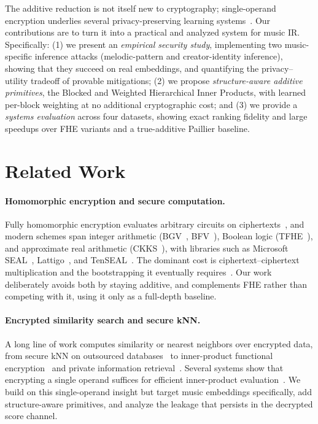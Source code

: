 \documentclass[sigconf,nonacm]{acmart}
\begin{document}
The additive reduction is not itself new to cryptography; single-operand encryption underlies several privacy-preserving learning systems~\cite{prism_sigmod21,otawose_sigmod23,zhao2025note,ipfe2015}. Our contributions are to turn it into a practical and analyzed system for music IR. Specifically: (1) we present an \emph{empirical security study}, implementing two music-specific inference attacks (melodic-pattern and creator-identity inference), showing that they succeed on real embeddings, and quantifying the privacy--utility tradeoff of provable mitigations; (2) we propose \emph{structure-aware additive primitives}, the Blocked and Weighted Hierarchical Inner Products, with learned per-block weighting at no additional cryptographic cost; and (3) we provide a \emph{systems evaluation} across four datasets, showing exact ranking fidelity and large speedups over FHE variants and a true-additive Paillier baseline.

\section{Related Work}
\label{sec:related}
\paragraph{Homomorphic encryption and secure computation.}
Fully homomorphic encryption evaluates arbitrary circuits on ciphertexts~\cite{cgentry_stoc09}, and modern schemes span integer arithmetic (BGV~\cite{bgv2012}, BFV~\cite{bfv2012}), Boolean logic (TFHE~\cite{tfhe2020}), and approximate real arithmetic (CKKS~\cite{cheon2017homomorphic}), with libraries such as Microsoft SEAL~\cite{sealcrypto}, Lattigo~\cite{lattigo}, and TenSEAL~\cite{benaissa2021tenseal}. The dominant cost is ciphertext--ciphertext multiplication and the bootstrapping it eventually requires~\cite{ckksboot2018}. Our work deliberately avoids both by staying additive, and complements FHE rather than competing with it, using it only as a full-depth baseline.

\paragraph{Encrypted similarity search and secure kNN.}
A long line of work computes similarity or nearest neighbors over encrypted data, from secure kNN on outsourced databases~\cite{secureknn2009,elmehdwi2014} to inner-product functional encryption~\cite{ipfe2015} and private information retrieval~\cite{pir1995}. Several systems show that encrypting a single operand suffices for efficient inner-product evaluation~\cite{prism_sigmod21,otawose_sigmod23,zhao2025note}. We build on this single-operand insight but target music embeddings specifically, add structure-aware primitives, and analyze the leakage that persists in the decrypted score channel.
\end{document}
